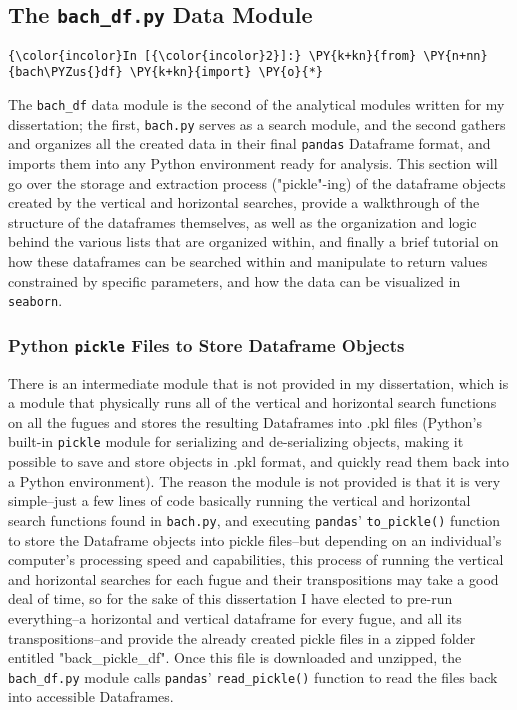     \subsection{\texorpdfstring{The \texttt{bach\_df.py} Data
Module}{The bach\_df.py Data Module}}\label{the-bach_df.py-data-module}

    \begin{Verbatim}[commandchars=\\\{\}]
{\color{incolor}In [{\color{incolor}2}]:} \PY{k+kn}{from} \PY{n+nn}{bach\PYZus{}df} \PY{k+kn}{import} \PY{o}{*}
\end{Verbatim}

    The \texttt{bach\_df} data module is the second of the analytical
modules written for my dissertation; the first, \texttt{bach.py} serves
as a search module, and the second gathers and organizes all the created
data in their final \texttt{pandas} Dataframe format, and imports them
into any Python environment ready for analysis. This section will go
over the storage and extraction process ("pickle"-ing) of the dataframe
objects created by the vertical and horizontal searches, provide a
walkthrough of the structure of the dataframes themselves, as well as
the organization and logic behind the various lists that are organized
within, and finally a brief tutorial on how these dataframes can be
searched within and manipulate to return values constrained by specific
parameters, and how the data can be visualized in \texttt{seaborn}.

\subsubsection{\texorpdfstring{Python \texttt{pickle} Files to Store
Dataframe
Objects}{Python pickle Files to Store Dataframe Objects}}\label{python-pickle-files-to-store-dataframe-objects}

There is an intermediate module that is not provided in my dissertation,
which is a module that physically runs all of the vertical and
horizontal search functions on all the fugues and stores the resulting
Dataframes into .pkl files (Python's built-in \texttt{pickle} module for
serializing and de-serializing objects, making it possible to save and
store objects in .pkl format, and quickly read them back into a Python
environment). The reason the module is not provided is that it is very
simple--just a few lines of code basically running the vertical and
horizontal search functions found in \texttt{bach.py}, and executing
\texttt{pandas}' \texttt{to\_pickle()} function to store the Dataframe
objects into pickle files--but depending on an individual's computer's
processing speed and capabilities, this process of running the vertical
and horizontal searches for each fugue and their transpositions may take
a good deal of time, so for the sake of this dissertation I have elected
to pre-run everything--a horizontal and vertical dataframe for every
fugue, and all its transpositions--and provide the already created
pickle files in a zipped folder entitled "back\_pickle\_df". Once this
file is downloaded and unzipped, the \texttt{bach\_df.py} module calls
\texttt{pandas}' \texttt{read\_pickle()} function to read the files back
into accessible Dataframes.

